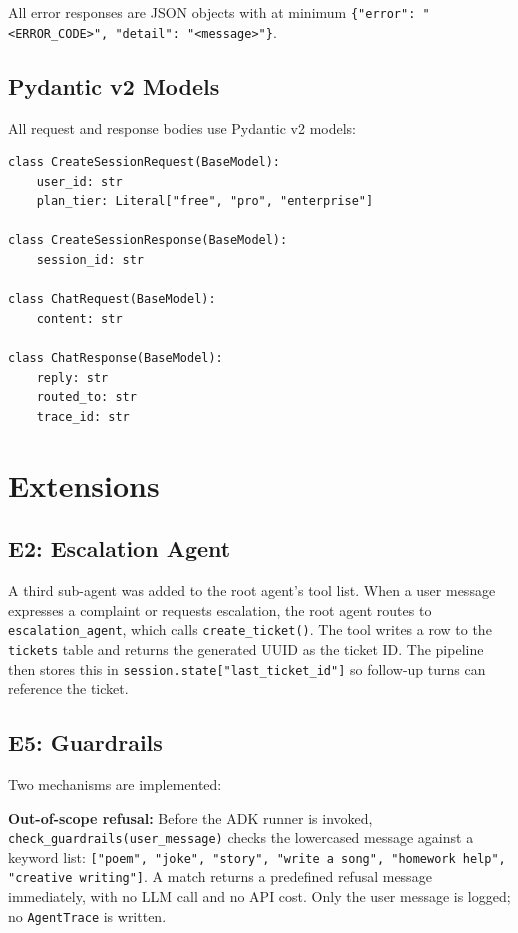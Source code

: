 \documentclass[12pt,a4paper]{article}
\begin{document}
All error responses are JSON objects with at minimum \texttt{\{"error": "\textless{}ERROR\_CODE\textgreater{}", "detail": "\textless{}message\textgreater{}"\}}.

\subsection{Pydantic v2 Models}

All request and response bodies use Pydantic v2 models:

\begin{lstlisting}[style=python]
class CreateSessionRequest(BaseModel):
    user_id: str
    plan_tier: Literal["free", "pro", "enterprise"]

class CreateSessionResponse(BaseModel):
    session_id: str

class ChatRequest(BaseModel):
    content: str

class ChatResponse(BaseModel):
    reply: str
    routed_to: str
    trace_id: str
\end{lstlisting}

\section{Extensions}

\subsection{E2: Escalation Agent}

A third sub-agent was added to the root agent's tool list. When a user message expresses a complaint or requests escalation, the root agent routes to \texttt{escalation\_agent}, which calls \texttt{create\_ticket()}. The tool writes a row to the \texttt{tickets} table and returns the generated UUID as the ticket ID. The pipeline then stores this in \texttt{session.state["last\_ticket\_id"]} so follow-up turns can reference the ticket.

\subsection{E5: Guardrails}

Two mechanisms are implemented:

\textbf{Out-of-scope refusal:} Before the ADK runner is invoked, \texttt{check\_guardrails(user\_message)} checks the lowercased message against a keyword list: \texttt{["poem", "joke", "story", "write a song", "homework help", "creative writing"]}. A match returns a predefined refusal message immediately, with no LLM call and no API cost. Only the user message is logged; no \texttt{AgentTrace} is written.
\end{document}
